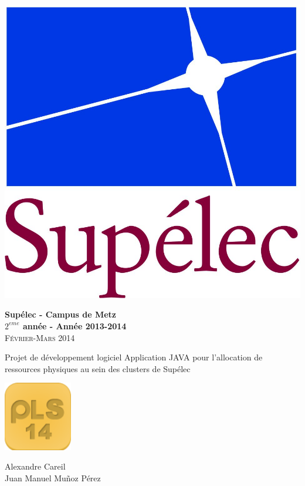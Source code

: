 \begin{minipage}{1\textwidth}
  \centering 

  \begin{flushleft}
    \includegraphics[scale=0.3]{LogoSup.jpg}
    \newline

    \textbf{Supélec - Campus de Metz\\
      $2^{eme}$ année - Année 2013-2014}\\
    \textsc{Février-Mars 2014}
  \end{flushleft}
  
  \vskip 5cm
  {\LARGE\textsc Projet de développement logiciel}
  \vskip 0.5cm
  {\LARGE\textsc Application JAVA pour l'allocation de ressources physiques au sein des clusters de Supélec}

  \vskip 2cm
  \begin{center}
    \includegraphics[width=3cm]{images/logos/logo_pls14_carre.png}
  \end{center}
  \vskip 2cm

  \Large{Alexandre Careil \\
    Juan Manuel Mu\~noz Pérez}
\end{minipage}

